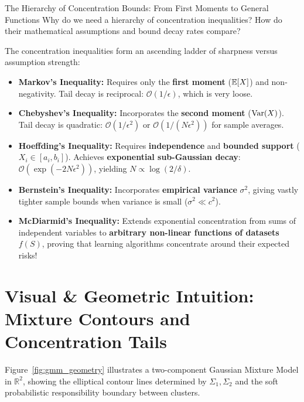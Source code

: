 \begin{ponderbox}{The Hierarchy of Concentration Bounds: From First Moments to General Functions}
Why do we need a hierarchy of concentration inequalities? How do their mathematical assumptions and bound decay rates compare?

\tcblower
The concentration inequalities form an ascending ladder of sharpness versus assumption strength:
\begin{itemize}
    \item \textbf{Markov's Inequality:} Requires only the \textbf{first moment} ($\operatorname{\mathbb{E}}[X]$) and non-negativity. Tail decay is reciprocal: $\mathcal{O}(1/\epsilon)$, which is very loose.
    \item \textbf{Chebyshev's Inequality:} Incorporates the \textbf{second moment} ($\operatorname{Var}(X)$). Tail decay is quadratic: $\mathcal{O}(1/\epsilon^2)$ or $\mathcal{O}(1/(N\epsilon^2))$ for sample averages.
    \item \textbf{Hoeffding's Inequality:} Requires \textbf{independence} and \textbf{bounded support} ($X_i \in [a_i, b_i]$). Achieves \textbf{exponential sub-Gaussian decay}: $\mathcal{O}(\exp(-2N\epsilon^2))$, yielding $N \propto \log(2/\delta)$.
    \item \textbf{Bernstein's Inequality:} Incorporates \textbf{empirical variance} $\sigma^2$, giving vastly tighter sample bounds when variance is small ($\sigma^2 \ll c^2$).
    \item \textbf{McDiarmid's Inequality:} Extends exponential concentration from sums of independent variables to \textbf{arbitrary non-linear functions of datasets} $f(S)$, proving that learning algorithms concentrate around their expected risks!
\end{itemize}
\end{ponderbox}

\section{Visual \& Geometric Intuition: Mixture Contours and Concentration Tails}

Figure~\ref{fig:gmm_geometry} illustrates a two-component Gaussian Mixture Model in $\mathbb{R}^2$, showing the elliptical contour lines determined by $\Sigma_1, \Sigma_2$ and the soft probabilistic responsibility boundary between clusters.


